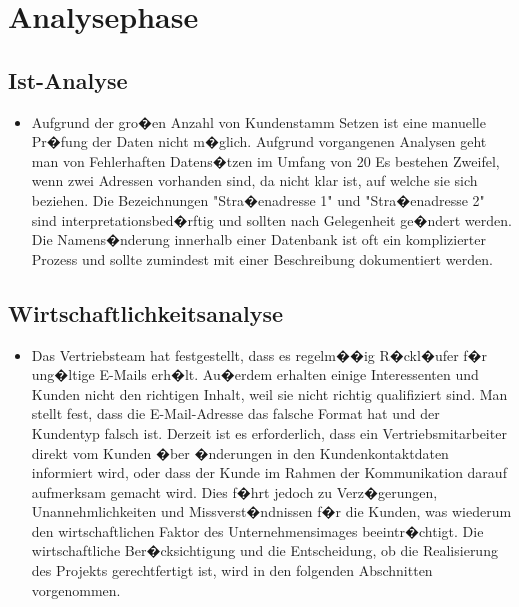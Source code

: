 \section{Analysephase} 
\label{sec:Analysephase}


\subsection{Ist-Analyse} 
\label{sec:IstAnalyse}
\begin{itemize}
	\item Aufgrund der gro�en Anzahl von Kundenstamm Setzen ist eine manuelle Pr�fung der Daten nicht
	m�glich. Aufgrund vorgangenen Analysen geht man von Fehlerhaften Datens�tzen im Umfang von 20%
	Es bestehen Zweifel, wenn zwei Adressen vorhanden sind, da nicht klar ist, auf welche sie sich beziehen. 
	Die Bezeichnungen "Stra�enadresse 1" und "Stra�enadresse 2" sind interpretationsbed�rftig und sollten nach Gelegenheit ge�ndert werden. 
	Die Namens�nderung innerhalb einer Datenbank ist oft ein komplizierter Prozess und sollte zumindest mit einer Beschreibung dokumentiert werden.
\end{itemize}


\subsection{Wirtschaftlichkeitsanalyse}
\label{sec:Wirtschaftlichkeitsanalyse}
\begin{itemize}
	\item Das Vertriebsteam hat festgestellt, dass es regelm��ig R�ckl�ufer f�r ung�ltige E-Mails erh�lt. 
	Au�erdem erhalten einige Interessenten und Kunden nicht den richtigen Inhalt, weil sie nicht richtig qualifiziert sind. 
	Man stellt fest, dass die E-Mail-Adresse das falsche Format hat und der Kundentyp falsch ist.
	Derzeit ist es erforderlich, dass ein Vertriebsmitarbeiter direkt vom Kunden �ber �nderungen in den Kundenkontaktdaten informiert wird, oder dass der Kunde im Rahmen der Kommunikation darauf aufmerksam gemacht wird.
	Dies f�hrt jedoch zu Verz�gerungen, Unannehmlichkeiten und Missverst�ndnissen f�r die Kunden, was wiederum den wirtschaftlichen Faktor des Unternehmensimages beeintr�chtigt.
	Die wirtschaftliche Ber�cksichtigung und die Entscheidung, ob die Realisierung des Projekts gerechtfertigt ist, wird in den folgenden Abschnitten vorgenommen.

\end{itemize}


